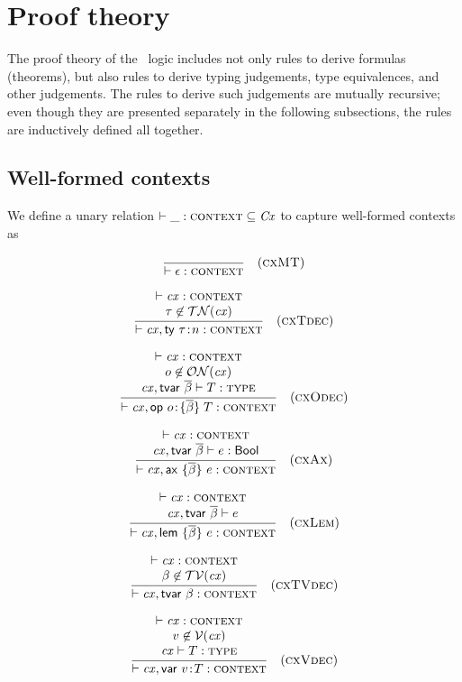 \section{Proof theory}
\label{proofth}

The proof theory of the \MS\ logic includes not only rules to derive formulas
(theorems), but also rules to derive typing judgements, type equivalences, and
other judgements. The rules to derive such judgements are mutually recursive;
even though they are presented separately in the following subsections, the
rules are inductively defined all together.

\subsection{Well-formed contexts}
\label{wfcx-rules}

We define a unary relation $\unarel{\cxwfY}{\Cx}$ to capture well-formed
contexts as

\[
\rruleO
 {\cxwf{\mtcx}}
 {\Rcxmt}
\]

\[
\rruleII
 {\cxwfO}
 {\tnam\not\in\cxtnam{\cx}}
 {\cxwf{\snoc{\cx}{\tdecO}}}
 {\Rcxtdec}
\]

\[
\rruleIII
 {\cxwfO}
 {\onam\not\in\cxonam{\cx}}
 {\isty{\snoc{\cx}{\tvdec{\tvarS}}}{\typ}}
 {\cxwf{\snoc{\cx}{\odecO}}}
 {\Rcxodec}
\]



\[
\rruleII
 {\cxwfO}
 {\hasty{\snoc{\cx}{\tvdec{\tvarS}}}{\expr}{\bool}}
 {\cxwf{\snoc{\cx}{\axO}}}
 {\Rcxax}
\]

\[
\rruleII
 {\cxwfO}
 {\theo{\snoc{\cx}{\tvdec{\tvarS}}}{\expr}}
 {\cxwf{\snoc{\cx}{\lemO}}}
 {\Rcxlem}
\]

\[
\rruleII
 {\cxwfO}
 {\tvar\not\in\cxtvar{\cx}}
 {\cxwf{\snoc{\cx}{\tvdecO}}}
 {\Rcxtvdec}
\]

\[
\rruleIII
 {\cxwfO}
 {\var\not\in\cxvar{\cx}}
 {\isty{\cx}{\typ}}
 {\cxwf{\snoc{\cx}{\vdecO}}}
 {\Rcxvdec}
\]

